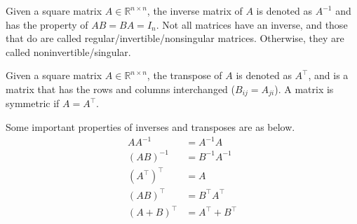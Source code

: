 \begin{definition}
    Given a square matrix $A\in\mathbb{R}^{n\times n}$, the inverse matrix of $A$
    is denoted as $A^{-1}$ and has the property of $AB=BA=I_n$. Not all matrices
    have an inverse, and those that do are called regular/invertible/nonsingular
    matrices. Otherwise, they are called noninvertible/singular.
\end{definition}

\begin{definition}
    Given a square matrix $A\in\mathbb{R}^{n\times n}$, the transpose of $A$
    is denoted as $A^\intercal$, and is a matrix that has the rows and columns
    interchanged ($B_{ij}=A_{ji}$). A matrix is symmetric if $A=A^\intercal$.
\end{definition}
\begin{svgraybox}
    Some important properties of inverses and transposes are as below.
    \[
        \begin{split}
            AA^{-1} &= A^{-1}A \\
            (AB)^{-1}&= B^{-1}A^{-1} \\
            (A^\intercal)^\intercal &= A\\
            (AB)^\intercal &= B^\intercal A^\intercal\\
            (A + B)^\intercal &= A^\intercal + B^\intercal
        \end{split}
    \]
\end{svgraybox}









